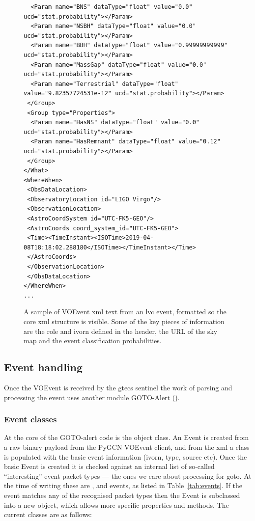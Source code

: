 \begin{colsection}
\begin{colsection}
\begin{figure}[p]
\begin{lstlisting}
  <Param name="BNS" dataType="float" value="0.0" ucd="stat.probability"></Param>
  <Param name="NSBH" dataType="float" value="0.0" ucd="stat.probability"></Param>
  <Param name="BBH" dataType="float" value="0.99999999999" ucd="stat.probability"></Param>
  <Param name="MassGap" dataType="float" value="0.0" ucd="stat.probability"></Param>
  <Param name="Terrestrial" dataType="float" value="9.82357724531e-12" ucd="stat.probability"></Param>
 </Group>
 <Group type="Properties">
  <Param name="HasNS" dataType="float" value="0.0" ucd="stat.probability"></Param>
  <Param name="HasRemnant" dataType="float" value="0.12" ucd="stat.probability"></Param>
 </Group>
</What>
<WhereWhen>
 <ObsDataLocation>
 <ObservatoryLocation id="LIGO Virgo"/>
 <ObservationLocation>
 <AstroCoordSystem id="UTC-FK5-GEO"/>
 <AstroCoords coord_system_id="UTC-FK5-GEO">
 <Time><TimeInstant><ISOTime>2019-04-08T18:18:02.288180</ISOTime></TimeInstant></Time>
 </AstroCoords>
 </ObservationLocation>
 </ObsDataLocation>
</WhereWhen>
...
\end{lstlisting}
\caption[VOEvent XML sample]{A sample of VOEvent \gls{xml} text from an \gls{lvc} event, formatted so the core \gls{xml} structure is visible. Some of the key pieces of information are the role and \gls{ivorn} defined in the header, the URL of the sky map and the event classification probabilities.
}
\label{fig:voevent_xml}
\end{figure}

\newpage

\end{colsection}


\subsection{Event handling}
\label{sec:event_handling}
\begin{colsection}

Once the VOEvent is received by the \gls{gtecs} sentinel the work of parsing and processing the event uses another  module GOTO-Alert ().

\subsubsection{Event classes}

At the core of the GOTO-alert code is the  object class. An Event is created from a raw binary payload from the PyGCN VOEvent client, and from the \gls{xml} a  class is populated with the basic event information (\gls{ivorn}, type, source etc). Once the basic Event is created it is checked against an internal list of so-called ``interesting'' event packet types --- the ones we care about processing for \gls{goto}. At the time of writing these are ,  and  events, as listed in Table~\ref{tab:events}. If the event matches any of the recognised packet types then the Event is subclassed into a new object, which allows more specific properties and methods. The current classes are as follows:


\end{colsection}
\end{colsection}
